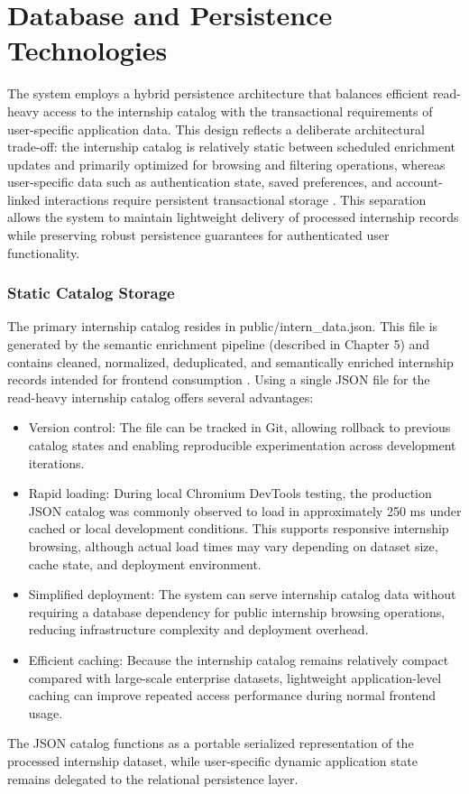 \section{Database and Persistence Technologies}
The system employs a hybrid persistence architecture that balances efficient read-heavy access to the internship catalog with the transactional requirements of user-specific application data. This design reflects a deliberate architectural trade-off: the internship catalog is relatively static between scheduled enrichment updates and primarily optimized for browsing and filtering operations, whereas user-specific data such as authentication state, saved preferences, and account-linked interactions require persistent transactional storage \cite{kleppmann2017designing, codd1970relational}.
This separation allows the system to maintain lightweight delivery of processed internship records while preserving robust persistence guarantees for authenticated user functionality.
\subsubsection*{Static Catalog Storage}
The primary internship catalog resides in public/intern\_data.json. This file is generated by the semantic enrichment pipeline (described in Chapter 5) and contains cleaned, normalized, deduplicated, and semantically enriched internship records intended for frontend consumption \cite{doan2012principles, chu2016data, kleppmann2017designing}.
Using a single JSON file for the read-heavy internship catalog offers several advantages:
\begin{itemize}
\item Version control: The file can be tracked in Git, allowing rollback to previous catalog states and enabling reproducible experimentation across development iterations.
\item Rapid loading: During local Chromium DevTools testing, the production JSON catalog was commonly observed to load in approximately 250 ms under cached or local development conditions. This supports responsive internship browsing, although actual load times may vary depending on dataset size, cache state, and deployment environment.
\item Simplified deployment: The system can serve internship catalog data without requiring a database dependency for public internship browsing operations, reducing infrastructure complexity and deployment overhead.
\item Efficient caching: Because the internship catalog remains relatively compact compared with large-scale enterprise datasets, lightweight application-level caching can improve repeated access performance during normal frontend usage.
\end{itemize}
The JSON catalog functions as a portable serialized representation of the processed internship dataset, while user-specific dynamic application state remains delegated to the relational persistence layer.
